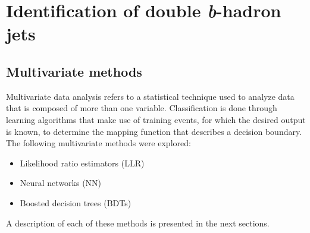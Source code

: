 %
\chapter{Identification of double \emph{\textbf{b}}-hadron jets}\label{ch:mva}
%


\section{Multivariate methods}\label{sec:mvamethods}

Multivariate data analysis refers to a statistical technique used to analyze data that %
 is composed of more than one variable.  Classification is done through learning algorithms that make use of training events,  for which the desired output is known, to determine the mapping function that describes a decision boundary. The following multivariate methods were explored: %

\begin{itemize}\addtolength{\itemsep}{-0.4\baselineskip}
\item
Likelihood ratio estimators (LLR)
\item
Neural networks (NN)
\item
Boosted decision trees (BDTs)
\end{itemize}

A description of each of these methods is presented in the next sections.

